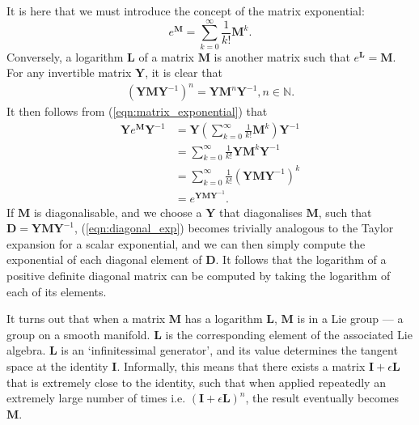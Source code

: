         It is here that we must introduce the concept of the matrix exponential:
        \begin{equation}
          e^{\mathbf{M}} = \sum_{k=0}^{\infty}\frac{1}{k!}\mathbf{M}^k. \label{eqn:matrix_exponential}
        \end{equation}
        Conversely, a logarithm $\mathbf{L}$ of a matrix $\mathbf{M}$ is another matrix such that $e^\mathbf{L} = \mathbf{M}$. For any invertible matrix $\mathbf{Y}$, it is clear that
        \begin{gather}
          (\mathbf{YM}\mathbf{Y}^{-1})^n = \mathbf{Y}\mathbf{M}^n\mathbf{Y}^{-1}, n \in \mathbb{N}.
        \end{gather}
        It then follows from (\ref{eqn:matrix_exponential}) that
        \begin{align}
          \mathbf{Y}e^{\mathbf{M}}\mathbf{Y}^{-1} &= \mathbf{Y}\left(\sum_{k=0}^{\infty}\frac{1}{k!}\mathbf{M}^k\right)\mathbf{Y}^{-1} \\
                                                  &= \sum_{k=0}^{\infty}\frac{1}{k!}\mathbf{Y}\mathbf{M}^k\mathbf{Y}^{-1} \\
                                                  &= \sum_{k=0}^{\infty}\frac{1}{k!}(\mathbf{YM}\mathbf{Y}^{-1})^k \label{eqn:diagonal_exp} \\
                                                  &= e^{\mathbf{YM}\mathbf{Y}^{-1}}.
        \end{align}
        If $\mathbf{M}$ is diagonalisable, and we choose a $\mathbf{Y}$ that diagonalises $\mathbf{M}$, such that $\mathbf{D} = \mathbf{YMY}^{-1}$, (\ref{eqn:diagonal_exp}) becomes trivially analogous to the Taylor expansion for a scalar exponential, and we can then simply compute the exponential of each diagonal element of $\mathbf{D}$. It follows that the logarithm of a positive definite diagonal matrix can be computed by taking the logarithm of each of its elements.
        
        It turns out that when a matrix $\mathbf{M}$ has a logarithm $\mathbf{L}$, $\mathbf{M}$ is in a Lie group --- a group on a smooth manifold. $\mathbf{L}$ is the corresponding element of the associated Lie algebra. $\mathbf{L}$ is an `infinitessimal generator', and its value determines the tangent space at the identity $\mathbf{I}$. Informally, this means that there exists a matrix $\mathbf{I} + \epsilon \mathbf{L}$ that is extremely close to the identity, such that when applied repeatedly an extremely large number of times i.e. $(\mathbf{I} + \epsilon \mathbf{L})^n$, the result eventually becomes $\mathbf{M}$.
        
